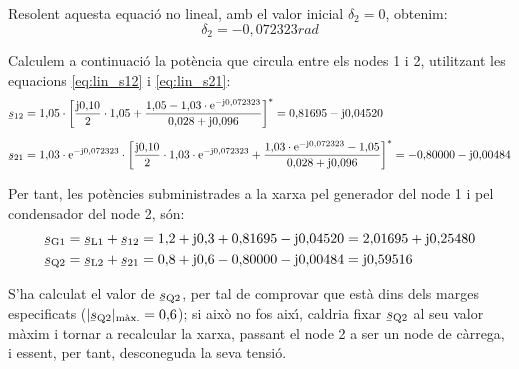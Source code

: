\begin{exemple}
Resolent aquesta equaci\'{o} no lineal, amb el valor inicial $\delta_2=0$, obtenim:
\[\delta_2=-0{,}072323\unit{rad}\]

Calculem a continuaci\'{o} la pot\`{e}ncia que circula entre els nodes 1 i 2, utilitzant les equacions \eqref{eq:lin_s12} i \eqref{eq:lin_s21}:
\begin{align*}
\cmplx{s}_{12} &= 1{,}05 \cdot\left[ \frac{\ju0{,}10}{2} \cdot1{,}05 + \frac{ 1{,}05 -
1{,}03\cdot\eu^{-\ju0{,}072323}} {0{,}028+\ju0{,}096} \right]^* =
0{,}81695 - \ju 0{,}04520 \\[1.5ex]
\cmplx{s}_{21} &= 1{,}03\cdot \eu^{-\ju0{,}072323} \cdot\left[ \frac{\ju0{,}10}{2}\cdot
1{,}03\cdot \eu^{-\ju0{,}072323} + \frac{ 1{,}03\cdot\eu^{-\ju0{,}072323} -1{,}05}
{0{,}028+\ju0{,}096} \right]^* = -0{,}80000 - \ju 0{,}00484
\end{align*}

Per tant, les pot\`{e}ncies subministrades a la xarxa pel generador del node 1 i pel
condensador del node 2, s\'{o}n:
\begin{align*}
 \cmplx{s}\ped{G1} &= \cmplx{s}\ped{L1} + \cmplx{s}_{12} = 1{,}2+\ju0{,}3 + 0{,}81695 - \ju 0{,}04520 = 2{,}01695 + \ju 0{,}25480 \\
 \cmplx{s}\ped{Q2} &= \cmplx{s}\ped{L2} + \cmplx{s}_{21} = 0{,}8+\ju0{,}6 - 0{,}80000 - \ju 0{,}00484 =  \ju 0{,}59516
\end{align*}

S'ha calculat el valor de $\cmplx{s}\ped{Q2}$, per tal de comprovar que est\`{a} dins dels
marges especificats ($|\cmplx{s}\ped{Q2}|_{\text{m\`{a}x.}}=0{,}6$); si aix\`{o} no fos aix\'{\i},
caldria fixar $\cmplx{s}\ped{Q2}$ al seu valor m\`{a}xim i tornar a recalcular la xarxa,
passant el node 2 a ser un node de c\`{a}rrega, i essent, per tant, desconeguda la seva
tensi\'{o}.
\end{exemple}



